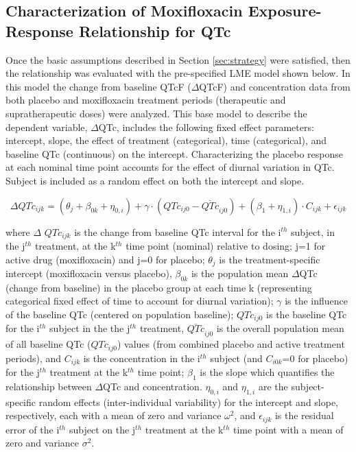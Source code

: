 \documentclass[
]{article}
\begin{document}
\hypertarget{characterization-of-moxifloxacin-exposure-response-relationship-for-qtc}{%
\subsection{\texorpdfstring{Characterization of Moxifloxacin
Exposure-Response Relationship for QTc
\label{sec:modelfit}}{Characterization of Moxifloxacin Exposure-Response Relationship for QTc }}\label{characterization-of-moxifloxacin-exposure-response-relationship-for-qtc}}

Once the basic assumptions described in Section \ref{sec:strategy} were
satisfied, then the relationship was evaluated with the pre-specified
LME model shown below. In this model the change from baseline QTcF
(\(\Delta\)QTcF) and concentration data from both placebo and
moxifloxacin treatment periods (therapeutic and supratherapeutic doses)
were analyzed. This base model to describe the dependent variable,
\(\Delta\)QTc, includes the following fixed effect parameters:
intercept, slope, the effect of treatment (categorical), time
(categorical), and baseline QTc (continuous) on the intercept.
Characterizing the placebo response at each nominal time point accounts
for the effect of diurnal variation in QTc. Subject is included as a
random effect on both the intercept and slope.

\begin{equation} \label{E-R}
\Delta QTc_{ijk} = (\theta_j + \beta_{0k} + \eta_{0,i}) + \gamma \cdot (QTc_{ij0} - \overline{QTc}_{ij0}) + (\beta_1 + \eta_{1,i}) \cdot C_{ijk} + \epsilon_{ijk}
\end{equation}

where \(\Delta\) \(QTc_{ijk}\) is the change from baseline QTc interval
for the i\(^{th}\) subject, in the j\(^{th}\) treatment, at the
k\(^{th}\) time point (nominal) relative to dosing; j=1 for active drug
(moxifloxacin) and j=0 for placebo; \(\theta_j\) is the
treatment-specific intercept (moxifloxacin versus placebo),
\(\beta_{0k}\) is the population mean \(\Delta\)QTc (change from
baseline) in the placebo group at each time k (representing categorical
fixed effect of time to account for diurnal variation); \(\gamma\) is
the influence of the baseline QTc (centered on population baseline);
\(QTc_{ij0}\) is the baseline QTc for the i\(^{th}\) subject in the the
j\(^{th}\) treatment, \(\overline{QTc}_{ij0}\) is the overall population
mean of all baseline QTc (\(QTc_{ij0}\)) values (from combined placebo
and active treatment periods), and \(C_{ijk}\) is the concentration in
the i\(^{th}\) subject (and \(C_{i0k}\)=0 for placebo) for the
j\(^{th}\) treatment at the k\(^{th}\) time point; \(\beta_1\) is the
slope which quantifies the relationship between \(\Delta\)QTc and
concentration. \(\eta_{0,i}\) and \(\eta_{1,i}\) are the
subject-specific random effects (inter-individual variability) for the
intercept and slope, respectively, each with a mean of zero and variance
\(\omega^2\), and \(\epsilon_{ijk}\) is the residual error of the
i\(^{th}\) subject on the j\(^{th}\) treatment at the k\(^{th}\) time
point with a mean of zero and variance \(\sigma^2\).
\end{document}

